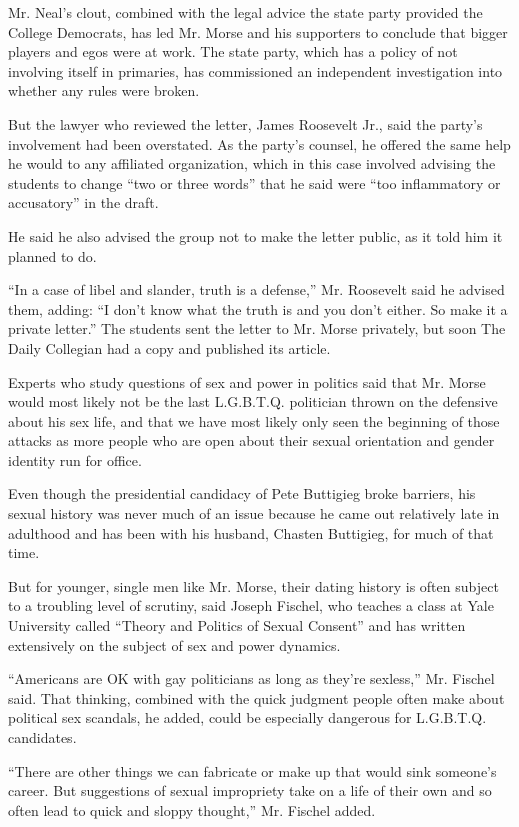 Mr. Neal's clout, combined with the legal advice the state party
provided the College Democrats, has led Mr. Morse and his supporters to
conclude that bigger players and egos were at work. The state party,
which has a policy of not involving itself in primaries, has
commissioned an independent investigation into whether any rules were
broken.

But the lawyer who reviewed the letter, James Roosevelt Jr., said the
party's involvement had been overstated. As the party's counsel, he
offered the same help he would to any affiliated organization, which in
this case involved advising the students to change ``two or three
words'' that he said were ``too inflammatory or accusatory'' in the
draft.

He said he also advised the group not to make the letter public, as it
told him it planned to do.

``In a case of libel and slander, truth is a defense,'' Mr. Roosevelt
said he advised them, adding: ``I don't know what the truth is and you
don't either. So make it a private letter.'' The students sent the
letter to Mr. Morse privately, but soon The Daily Collegian had a copy
and published its article.

Experts who study questions of sex and power in politics said that Mr.
Morse would most likely not be the last L.G.B.T.Q. politician thrown on
the defensive about his sex life, and that we have most likely only seen
the beginning of those attacks as more people who are open about their
sexual orientation and gender identity run for office.

Even though the presidential candidacy of Pete Buttigieg broke barriers,
his sexual history was never much of an issue because he came out
relatively late in adulthood and has been with his husband, Chasten
Buttigieg, for much of that time.

But for younger, single men like Mr. Morse, their dating history is
often subject to a troubling level of scrutiny, said Joseph Fischel, who
teaches a class at Yale University called ``Theory and Politics of
Sexual Consent'' and has written extensively on the subject of sex and
power dynamics.

``Americans are OK with gay politicians as long as they're sexless,''
Mr. Fischel said. That thinking, combined with the quick judgment people
often make about political sex scandals, he added, could be especially
dangerous for L.G.B.T.Q. candidates.

``There are other things we can fabricate or make up that would sink
someone's career. But suggestions of sexual impropriety take on a life
of their own and so often lead to quick and sloppy thought,'' Mr.
Fischel added.

